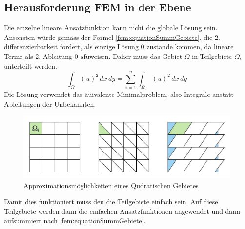 \subsection{Herausforderung FEM in der Ebene}
Die einzelne lineare Ansatzfunktion kann nicht die globale Lösung sein. Ansonsten würde gemäss der Formel \eqref{fem:equationSummGebiete}, die 2. differenzierbarkeit fordert, als einzige Lösung 0 zustande kommen, da lineare Terme als 2. Ableitung 0 afuweisen. Daher muss das Gebiet $\Omega$ in Teilgebiete $\Omega_i$ unterteilt werden. 
\begin{equation}
\int_{\Omega} (u)^2 \, dx \, dy = \sum \limits_{i=1}^n \int_{\Omega_i} (u)^2 \, dx \, dy 
\label{fem:equationSummGebiete}
\end{equation}
Die Lösung verwendet das äuivalente Minimalproblem, also Integrale anstatt Ableitungen der Unbekannten.
\begin{figure}[h!]
	\centering
	\includegraphics[scale=0.6]{papers/fem/Images/Figuren.jpeg}
	\caption{Approximationsmöglichkeiten eines Qudratischen Gebietes}
	\label{fig:Figuren}
\end{figure}
Damit dies funktioniert müss den die Teilgebiete einfach sein. Auf diese Teilgebiete werden dann die einfachen Ansatzfunktionen angewendet und dann aufsummiert nach \eqref{fem:equationSummGebiete}.

